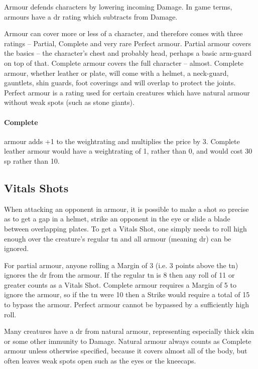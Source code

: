 \begin{multicols}{2}

\armourchart

\noindent
Armour defends characters by lowering incoming Damage. In game terms, armours have a \gls{dr} rating which subtracts from Damage.

Armour can cover more or less of a character, and therefore comes with three ratings -- Partial, Complete and very rare Perfect armour.
Partial armour covers the basics -- the character's chest and probably head, perhaps a basic arm-guard on top of that.
Complete armour covers the full character -- almost.
Complete armour, whether leather or plate, will come with a helmet, a neck-guard, gauntlets, shin guards, foot coverings and will overlap to protect the joints.
Perfect armour is a rating used for certain creatures which have natural armour without weak spots (such as stone giants).

\paragraph{Complete} armour adds +1 to the \gls{weightrating} and multiplies the price by 3.
Complete leather armour would have a \gls{weightrating} of 1, rather than 0, and would cost 30 sp rather than 10.

\subsection{Vitals Shots}\label{vitals}

When attacking an opponent in armour, it is possible to make a shot so precise as to get a gap in a helmet, strike an opponent in the eye or slide a blade between overlapping plates. To get a Vitals Shot, one simply needs to roll high enough over the creature's regular \gls{tn} and all armour (meaning \gls{dr}) can be ignored.


For partial armour, anyone rolling a Margin of 3 (i.e. 3 points above the \gls{tn}) ignores the \gls{dr} from the armour. If the regular \gls{tn} is 8 then any roll of 11 or greater counts as a Vitals Shot. Complete armour requires a Margin of 5 to ignore the armour, so if the \gls{tn} were 10 then a Strike would require a total of 15 to bypass the armour. Perfect armour cannot be bypassed by a sufficiently high roll.

Many creatures have a \gls{dr} from natural armour, representing especially thick skin or some other immunity to Damage. Natural armour always counts as Complete armour unless otherwise specified, because it covers almost all of the body, but often leaves weak spots open such as the eyes or the kneecaps.


\end{multicols}
